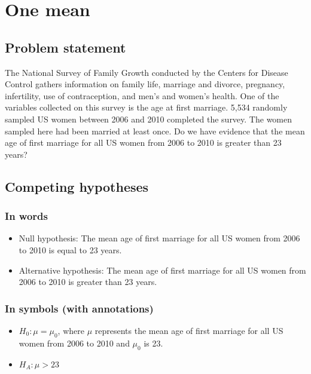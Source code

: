 \documentclass[12pt, krantz2,]{krantz}
\providecommand{\tightlist}{%
  \setlength{\itemsep}{0pt}\setlength{\parskip}{0pt}}
\begin{document}
\hypertarget{one-mean}{%
\section{One mean}\label{one-mean}}

\hypertarget{problem-statement}{%
\subsection{Problem statement}\label{problem-statement}}

The National Survey of Family Growth conducted by the
Centers for Disease Control gathers information on family life, marriage and divorce, pregnancy,
infertility, use of contraception, and men's and women's health. One of the variables collected on
this survey is the age at first marriage. 5,534 randomly sampled US women between 2006 and 2010 completed the survey. The women sampled here had been married at least once. Do we have evidence that the mean age of first marriage for all US women from 2006 to 2010 is greater than 23 years? \citep[Tweaked a bit from][ {[}Chapter 4{]}]{isrs2014}

\hypertarget{competing-hypotheses}{%
\subsection{Competing hypotheses}\label{competing-hypotheses}}

\hypertarget{in-words}{%
\subsubsection*{In words}\label{in-words}}


\begin{itemize}
\item
  Null hypothesis: The mean age of first marriage for all US women from 2006 to 2010 is equal to 23 years.
\item
  Alternative hypothesis: The mean age of first marriage for all US women from 2006 to 2010 is greater than 23 years.
\end{itemize}

\hypertarget{in-symbols-with-annotations}{%
\subsubsection*{In symbols (with annotations)}\label{in-symbols-with-annotations}}


\begin{itemize}
\tightlist
\item
  \(H_0: \mu = \mu_{0}\), where \(\mu\) represents the mean age of first marriage for all US women from 2006 to 2010 and \(\mu_0\) is 23.
\item
  \(H_A: \mu > 23\)
\end{itemize}
\end{document}
